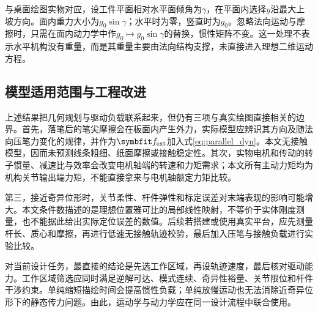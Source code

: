 与桌面绘图实物对应，设工件平面相对水平面倾角为$\gamma$，在平面内选择$y$沿最大上坡方向。面内重力大小为$g_0\sin\gamma$；水平时为零，竖直时为$g_0$。忽略法向运动与摩擦时，只需在面内动力学中作$g_0\mapsto g_0\sin\gamma$的替换，惯性矩阵不变。这一处理不表示水平机构没有重量，而是其重量主要由法向结构支撑，未直接进入理想二维运动方程。



\subsection{模型适用范围与工程改进}

上述结果把几何规划与驱动负载联系起来，但仍有三项与真实绘图直接相关的边界。首先，落笔后的笔尖摩擦会在板面内产生外力，实际模型应辨识其方向及随法向压笔力变化的规律，并作为$\vect f_{\mathrm{ext}}$加入式\eqref{eq:parallel_dyn}。本文无接触模型，因而未预测线条粗细、纸面摩擦或接触稳定性。其次，实物电机和传动的转子惯量、减速比与效率会改变电机轴端的转速和力矩需求；本文所有主动力矩均为机构关节输出端力矩，不能直接拿来与电机轴额定力矩比较。

第三，接近奇异位形时，关节柔性、杆件弹性和标定误差对末端表现的影响可能增大。本文条件数描述的是理想位置雅可比的局部线性映射，不等价于实体刚度测量，也不能据此给出实际定位误差的数值。后续若搭建或使用真实平台，应先测量杆长、质心和摩擦，再进行低速无接触轨迹校验，最后加入压笔与接触负载进行实验比较。

对当前设计任务，最直接的结论是先选工作区域，再设轨迹速度，最后核对驱动能力。工作区域筛选应同时满足逆解可达、模式连续、奇异性裕量、关节限位和杆件干涉约束。单纯缩短描绘时间会提高惯性负载；单纯放慢运动也无法消除近奇异位形下的静态传力问题。由此，运动学与动力学应在同一设计流程中联合使用。
